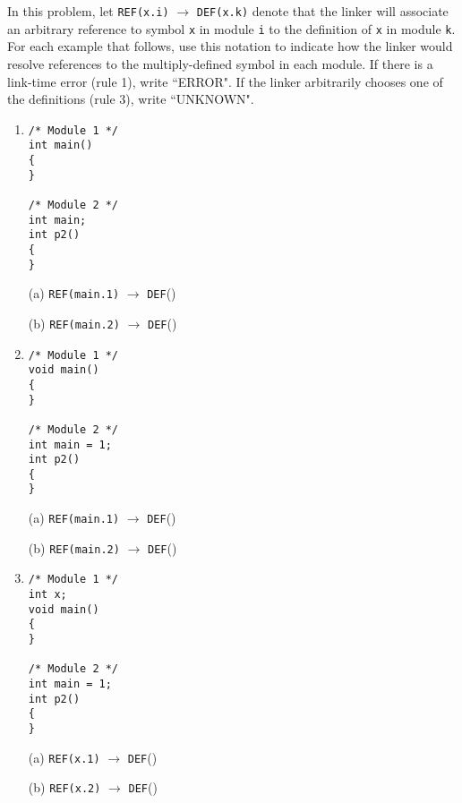 \documentclass[12pt]{article}
\newenvironment{ex}[2][Exercise]{\begin{trivlist}
		\item[\hskip \labelsep {\bfseries #1}\hskip \labelsep {\bfseries #2.}]}{\end{trivlist}}
\begin{document}
\begin{ex}{7.2}
	In this problem, let \texttt{REF(x.i)} $\to$ \texttt{DEF(x.k)} denote that the linker will associate
	an arbitrary reference to symbol \texttt{x} in module \texttt{i} to the definition of \texttt{x}
	in module \texttt{k}. For each example that follows, use this notation to indicate how the linker
	would resolve references to the multiply-defined symbol in each module. If there is a link-time
	error (rule 1), write ``ERROR". If the linker arbitrarily chooses one of the definitions (rule 3),
	write ``UNKNOWN".
	\begin{enumerate}[label=(\alph*)]
		\item \begin{lstlisting}
/* Module 1 */
int main()
{
}

/* Module 2 */
int main;
int p2()
{
}
		\end{lstlisting}
		(a) \texttt{REF(main.1)} $\to$ \texttt{DEF}(\makebox[1cm]{\hrulefill})
		
		(b) \texttt{REF(main.2)} $\to$ \texttt{DEF}(\makebox[1cm]{\hrulefill})
		\item \begin{lstlisting}
/* Module 1 */
void main()
{
}

/* Module 2 */
int main = 1;
int p2()
{
}
		\end{lstlisting}
		(a) \texttt{REF(main.1)} $\to$ \texttt{DEF}(\makebox[1cm]{\hrulefill})
		
		(b) \texttt{REF(main.2)} $\to$ \texttt{DEF}(\makebox[1cm]{\hrulefill})
		\item \begin{lstlisting}
/* Module 1 */
int x;
void main()
{
}

/* Module 2 */
int main = 1;
int p2()
{
}
		\end{lstlisting}
		(a) \texttt{REF(x.1)} $\to$ \texttt{DEF}(\makebox[1cm]{\hrulefill})
		
		(b) \texttt{REF(x.2)} $\to$ \texttt{DEF}(\makebox[1cm]{\hrulefill})
	\end{enumerate}
\end{ex}
\end{document}
